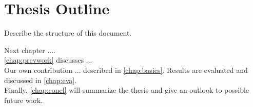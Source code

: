 \documentclass[thesis.tex]{subfiles}
\begin{document}
\section{Thesis Outline}
Describe the structure of this document.

Next chapter ....
\\
\autoref{chap:prevwork} discusses ...
\\
Our own contribution ... described in \autoref{chap:basics}.
Results are evaluated and discussed in \autoref{chap:eva}.
\\
Finally, \autoref{chap:concl} will summarize the thesis and give an outlook to possible future work.

\subfilebib %
\end{document}
